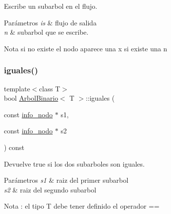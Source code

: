 Escribe un subarbol en el flujo. 


\begin{DoxyParams}{Parámetros}
{\em is} & flujo de salida \\
\hline
{\em n} & subarbol que se escribe. \\
\hline
\end{DoxyParams}
\begin{DoxyNote}{Nota}
si no existe el nodo aparece una x si existe una n 
\end{DoxyNote}
\mbox{\label{classArbolBinario_a8618907c8154d008f64252403e871bf4}} 
\subsubsection{\texorpdfstring{iguales()}{iguales()}}
{\footnotesize\ttfamily template$<$class T$>$ \\
bool \hyperlink{classArbolBinario}{Arbol\+Binario}$<$ T $>$\+::iguales (\begin{DoxyParamCaption}\item[{const \hyperlink{structArbolBinario_1_1info__nodo}{info\+\_\+nodo} $\ast$}]{s1,  }\item[{const \hyperlink{structArbolBinario_1_1info__nodo}{info\+\_\+nodo} $\ast$}]{s2 }\end{DoxyParamCaption}) const\hspace{0.3cm}{\ttfamily [private]}}



Devuelve true si los dos subarboles son iguales. 


\begin{DoxyParams}{Parámetros}
{\em s1} & raiz del primer subarbol \\
\hline
{\em s2} & raiz del segundo subarbol \\
\hline
\end{DoxyParams}
\begin{DoxyNote}{Nota}
\+: el tipo T debe tener definido el operador == 
\end{DoxyNote}
\mbox{\label{classArbolBinario_a1896b66e7b38f98ea4010e131998f376}} 

